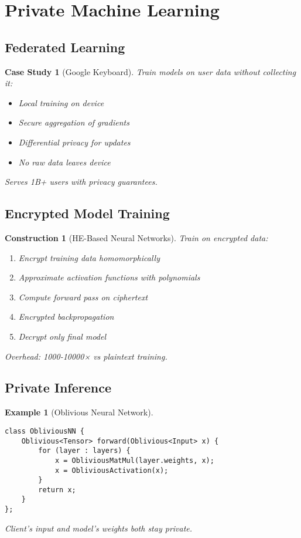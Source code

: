 \documentclass[11pt,final,hidelinks]{article}
\newtheorem{example}[theorem]{Example}
\newtheorem{construction}[theorem]{Construction}
\newtheorem{casestudy}[theorem]{Case Study}
\begin{document}
\section{Private Machine Learning}

\subsection{Federated Learning}

\begin{casestudy}[Google Keyboard]
Train models on user data without collecting it:
\begin{itemize}
    \item Local training on device
    \item Secure aggregation of gradients
    \item Differential privacy for updates
    \item No raw data leaves device
\end{itemize}
Serves 1B+ users with privacy guarantees.
\end{casestudy}

\subsection{Encrypted Model Training}

\begin{construction}[HE-Based Neural Networks]
Train on encrypted data:
\begin{enumerate}
    \item Encrypt training data homomorphically
    \item Approximate activation functions with polynomials
    \item Compute forward pass on ciphertext
    \item Encrypted backpropagation
    \item Decrypt only final model
\end{enumerate}
Overhead: 1000-10000× vs plaintext training.
\end{construction}

\subsection{Private Inference}

\begin{example}[Oblivious Neural Network]
\begin{verbatim}
class ObliviousNN {
    Oblivious<Tensor> forward(Oblivious<Input> x) {
        for (layer : layers) {
            x = ObliviousMatMul(layer.weights, x);
            x = ObliviousActivation(x);
        }
        return x;
    }
};
\end{verbatim}
Client's input and model's weights both stay private.
\end{example}
\end{document}
